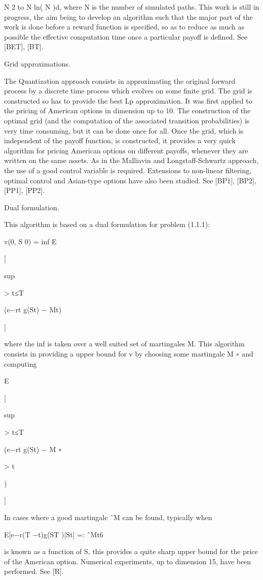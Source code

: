 \documentclass[11pt]{article}
\begin{document}
N 2 to N ln( N )d, where N is the number of simulated paths. This work is still in progress, the aim being to develop an algorithm such that the major part of the work is done before a reward function is specified, so as to reduce as much as possible the effective computation time once a particular payoff is defined. See [BET], [BT].

Grid approximations.

The Quantization approach consists in approximating the original forward process by a discrete time process which evolves on some finite grid. The grid is constructed so has to provide the best Lp approximation. It was first applied to the pricing of American options in dimension up to 10. The construction of the optimal grid (and the computation of the associated transition probabilities) is very time consuming, but it can be done once for all. Once the grid, which is independent of the payoff function, is constructed, it provides a very quick algorithm for pricing American options on different payoffs, whenever they are written on the same assets. As in the Malliavin and Longstaff-Schwartz approach, the use of a good control variable is required. Extensions to non-linear filtering, optimal control and Asian-type options have also been studied. See [BP1], [BP2], [PP1], [PP2].

Dual formulation.

This algorithm is based on a dual formulation for problem (1.1.1):

v(0, S 0) = inf E

[

sup

> t≤T

(e−rt g(St) − Mt)

]

where the inf is taken over a well suited set of martingales M. This algorithm consists in providing a upper bound for v by choosing some martingale M ∗ and computing

E

[

sup

> t≤T

(e−rt g(St) − M ∗

> t

)

]

In cases where a good martingale ˆM can be found, typically when

E[e−r(T −t)g(ST )|St] =: ˆMt6

is known as a function of S, this provides a quite sharp upper bound for the price of the American option. Numerical experiments, up to dimension 15, have been performed. See [R].
\end{document}

